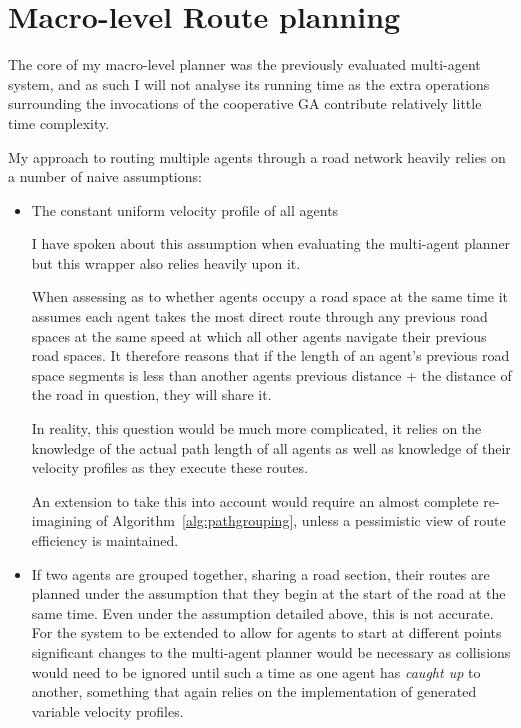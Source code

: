 \section{Macro-level Route planning}

The core of my macro-level planner was the previously evaluated multi-agent system, and as such I will not analyse its running time as the extra operations surrounding the invocations of the cooperative GA contribute relatively little time complexity.

My approach to routing multiple agents through a road network heavily relies on a number of naive assumptions:

\begin{itemize}
  \item The constant uniform velocity profile of all agents

        I have spoken about this assumption when evaluating the multi-agent planner but this wrapper also relies heavily upon it.

        When assessing as to whether agents occupy a road space at the same time it assumes each agent takes the most direct route through any previous road spaces at the same speed at which all other agents navigate their previous road spaces. It therefore reasons that if the length of an agent's previous road space segments is less than another agents previous distance + the distance of the road in question, they will share it.

        In reality, this question would be much more complicated, it relies on the knowledge of the actual path length of all agents as well as knowledge of their velocity profiles as they execute these routes.

        An extension to take this into account would require an almost complete re-imagining of Algorithm~\ref{alg:pathgrouping}, unless a pessimistic view of route efficiency is maintained.


  \item If two agents are grouped together, sharing a road section, their routes are planned under the assumption that they begin at the start of the road at the same time. Even under the assumption detailed above, this is not accurate. For the system to be extended to allow for agents to start at different points significant changes to the multi-agent planner would be necessary as collisions would need to be ignored until such a time as one agent has \textit{caught up} to another, something that again relies on the implementation of generated variable velocity profiles.


\end{itemize}
